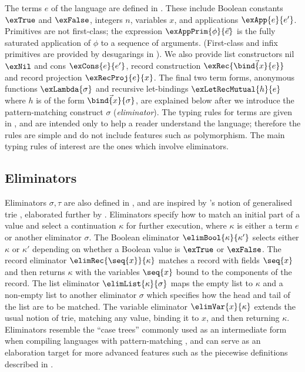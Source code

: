 The terms $e$ of the language are defined in . These include Boolean constants $\exTrue$ and $\exFalse$, integers $n$, variables $x$, and applications $\exApp{e}{e'}$. Primitives are not first-class; the expression $\exAppPrim{\phi}{\vec{e}}$ is the fully saturated application of $\phi$ to a sequence of arguments. (First-class and infix primitives are provided by desugarings in ). We also provide list constructors nil $\exNil$ and cons $\exCons{e}{e'}$, record construction $\exRec{\vec{\bind{x}{e}}}$ and record projection $\exRecProj{e}{x}$. The final two term forms, anonymous functions $\exLambda{\sigma}$ and recursive let-bindings $\exLetRecMutual{h}{e}$ where $h$ is of the form $\vec{\bind{x}{\sigma}}$, are explained below after we introduce the pattern-matching construct $\sigma$ (\emph{eliminator}). The typing rules for terms are given in , and are intended only to help a reader understand the language; therefore the rules are simple and do not include features such as polymorphism. The main typing rules of interest are the ones which involve eliminators.

\subsection{Eliminators}
\label{sec:core-language:syntax-eliminator}

Eliminators $\sigma, \tau$ are also defined in , and are inspired by \citeauthor{connelly95}'s notion of generalised trie \cite{connelly95}, elaborated further by \citet{hinze00}. Eliminators specify how to match an initial part of a value and select a continuation $\kappa$ for further execution, where $\kappa$ is either a term $e$ or another eliminator $\sigma$. The Boolean eliminator $\elimBool{\kappa}{\kappa'}$ selects either $\kappa$ or $\kappa'$ depending on whether a Boolean value is $\exTrue$ or $\exFalse$. The record eliminator $\elimRec{\seq{x}}{\kappa}$ matches a record with fields $\seq{x}$ and then returns $\kappa$ with the variables $\seq{x}$ bound to the components of the record. The list eliminator $\elimList{\kappa}{\sigma}$ maps the empty list to $\kappa$ and a non-empty list to another eliminator $\sigma$ which specifies how the head and tail of the list are to be matched. The variable eliminator $\elimVar{x}{\kappa}$ extends the usual notion of trie, matching any value, binding it to $x$, and then returning $\kappa$. Eliminators resemble the ``case trees'' commonly used as an intermediate form when compiling languages with pattern-matching \cite{graf20}, and can serve as an elaboration target for more advanced features such as the piecewise definitions described in .

